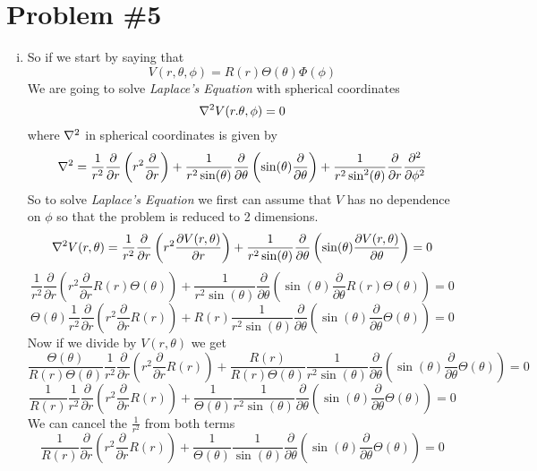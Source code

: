 \documentclass[11pt]{article}
\numberwithin{equation}{section}
\newcommand{\grad}{\bold\nabla}
\begin{document}
\section{Problem \#5}
\begin{enumerate}[(i)]
\item
So if we start by saying that
$$V(r,\theta,\phi) = R(r)\Theta(\theta)\Phi(\phi)$$
We are going to solve \emph{Laplace's Equation} with spherical coordinates 
$$\grad^2V(r.\theta,\phi) = 0$$
where $\grad^2$ in spherical coordinates is given by
$$\grad^2 = \frac{1}{r^2}\frac{\partial}{\partial r}\left(r^2\frac{\partial}{\partial r}\right) + \frac{1}{r^2\sin(\theta)}\frac{\partial}{\partial \theta}\left(\sin(\theta)\frac{\partial}{\partial \theta}\right) + \frac{1}{r^2\sin^2(\theta)}\frac{\partial}{\partial r}\frac{\partial^2}{\partial \phi^2}$$
So to solve \emph{Laplace's Equation} we first can assume that $V$ has no dependence on $\phi$ so that the problem is reduced to 2 dimensions.
$$\grad^2V(r,\theta) = \frac{1}{r^2}\frac{\partial}{\partial r}\left(r^2\frac{\partial V(r,\theta)}{\partial r}\right) + \frac{1}{r^2\sin(\theta)}\frac{\partial}{\partial \theta}\left(\sin(\theta)\frac{\partial V(r,\theta)}{\partial \theta}\right) = 0$$ 
$$\frac{1}{r^2}\frac{\partial}{\partial r}\left(r^2\frac{\partial }{\partial r}R(r)\Theta(\theta)\right) + \frac{1}{r^2\sin(\theta)}\frac{\partial}{\partial \theta}\left(\sin(\theta)\frac{\partial}{\partial \theta}R(r)\Theta(\theta)\right) = 0$$ 
$$\Theta(\theta)\frac{1}{r^2}\frac{\partial}{\partial r}\left(r^2\frac{\partial }{\partial r}R(r)\right) + R(r)\frac{1}{r^2\sin(\theta)}\frac{\partial}{\partial \theta}\left(\sin(\theta)\frac{\partial}{\partial \theta}\Theta(\theta)\right) = 0$$ 
Now if we divide by $V(r,\theta)$ we get 
$$\frac{\Theta(\theta)}{R(r)\Theta(\theta)}\frac{1}{r^2}\frac{\partial}{\partial r}\left(r^2\frac{\partial }{\partial r}R(r)\right) + \frac{R(r)}{R(r)\Theta(\theta)}\frac{1}{r^2\sin(\theta)}\frac{\partial}{\partial \theta}\left(\sin(\theta)\frac{\partial}{\partial \theta}\Theta(\theta)\right) = 0$$ 
$$\frac{1}{R(r)}\frac{1}{r^2}\frac{\partial}{\partial r}\left(r^2\frac{\partial }{\partial r}R(r)\right) + \frac{1}{\Theta(\theta)}\frac{1}{r^2\sin(\theta)}\frac{\partial}{\partial \theta}\left(\sin(\theta)\frac{\partial}{\partial \theta}\Theta(\theta)\right) = 0$$ 
We can cancel the $\frac{1}{r^2}$ from both terms
$$\frac{1}{R(r)}\frac{\partial}{\partial r}\left(r^2\frac{\partial }{\partial r}R(r)\right) + \frac{1}{\Theta(\theta)}\frac{1}{\sin(\theta)}\frac{\partial}{\partial \theta}\left(\sin(\theta)\frac{\partial}{\partial \theta}\Theta(\theta)\right) = 0$$ 

\end{enumerate}
\end{document}
